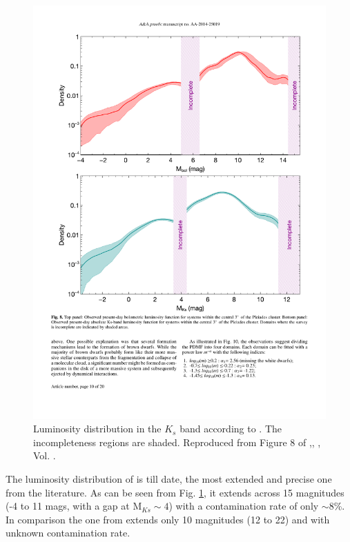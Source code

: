 \begin{figure}[ht!]
\begin{center}
\includegraphics[width=\textwidth]{background/Figures/F8_Bouy2015.pdf}
\caption{Luminosity distribution in the $K_s$ band according to \citet{Bouy2015}. The incompleteness regions are shaded. Reproduced from Figure 8 of \citet{Bouy2015},\textit{}, , Vol. .}
\label{fig:luminosityBouy}
\end{center}
\end{figure}

The luminosity distribution of \citet{Bouy2015} is till date, the most extended and precise one from the literature. As can be seen from Fig. \ref{fig:luminosityBouy}, it extends across 15 magnitudes (-4 to 11 mags, with a gap at M$_{Ks}\sim4$) with a contamination rate of only $\sim8$\%. In comparison the one from \citet{Lodieu2012} extends only 10 magnitudes (12 to 22) and with unknown contamination rate. 


